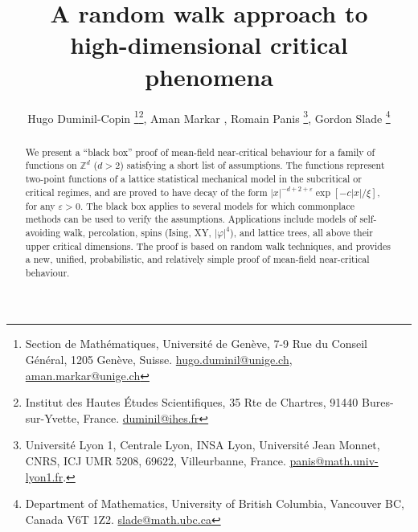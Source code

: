 \documentclass[11pt,a4paper]{article}
\title{A random walk approach to \\ high-dimensional critical phenomena}
\numberwithin{equation}{section}
\theoremstyle{plain}
\theoremstyle{definition}
\newcommand\1{\mathds{1}}
\begin{document}
\author{Hugo Duminil-Copin
\footnotemark[1]\footnote{Section de Math\'ematiques, Universit\'e de Gen\`eve, 7-9 Rue du Conseil G\'en\'eral, 1205 Gen\`eve, Suisse. \url{hugo.duminil@unige.ch}, \url{aman.markar@unige.ch}}\:\:\footnotemark[2]\footnote{Institut des Hautes Études Scientifiques, 35 Rte de Chartres, 91440 Bures-sur-Yvette, France. \url{duminil@ihes.fr}}\:,
Aman Markar
\footnotemark[1]\:,
Romain Panis
\thanks{Universit\'e Lyon 1, Centrale Lyon, INSA Lyon, Universit\'e Jean Monnet, CNRS, ICJ UMR 5208, 69622, Villeurbanne, France. \url{panis@math.univ-lyon1.fr}.}\:, Gordon Slade
  \thanks{Department of Mathematics,
     University of British Columbia,
     Vancouver BC, Canada V6T 1Z2.
       \url{slade@math.ubc.ca}}
}

\date{\vspace{-5ex}} %

\maketitle

\begin{abstract}
We present a ``black box'' proof of mean-field near-critical behaviour for
a family of functions on $\mathbb Z^d$ (${d>2}$) satisfying a short list of assumptions.
The functions represent two-point functions of a lattice statistical mechanical
model in the subcritical or critical regimes, and are proved to have
decay of the form $|x|^{-d+2+\varepsilon}\exp[-c|x|/\xi]$, for any $\varepsilon>0$.
The black box applies to
several models for which commonplace methods can be used to verify the
assumptions.
Applications include models of self-avoiding walk, percolation, spins (Ising, XY, $|\varphi|^4$), and  lattice trees, all above their upper critical dimensions.
The proof is based on random walk techniques, and
provides a new, unified, probabilistic,
and relatively simple proof of mean-field near-critical behaviour.
\end{abstract}
\end{document}
